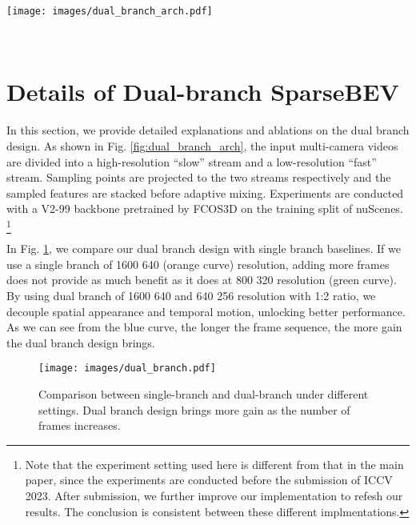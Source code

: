 \documentclass[10pt,twocolumn,letterpaper]{article}
\begin{document}
{\small


}

\begin{figure*}[t]
  \centering
  \texttt{[image: images/dual\_branch\_arch.pdf]}
  \vspace{-10pt}
  \caption{Architecture of dual-branch SparseBEV. The input multi-camera videos are divided into a high-resolution ``slow'' stream and a low-resolution ``fast'' stream.}
  \label{fig:dual_branch_arch}
\end{figure*}

\newpage
~
\newpage

\appendix

\section{Details of Dual-branch SparseBEV}

In this section, we provide detailed explanations and ablations on the dual branch design. As shown in Fig. \ref{fig:dual_branch_arch}, the input multi-camera videos are divided into a high-resolution ``slow'' stream and a low-resolution ``fast'' stream. Sampling points are projected to the two streams respectively and the sampled features are stacked before adaptive mixing. Experiments are conducted with a V2-99 backbone pretrained by FCOS3D \cite{fcos3d} on the training split of nuScenes. \footnote{Note that the experiment setting used here is different from that in the main paper, since the experiments are conducted before the submission of ICCV 2023. After submission, we further improve our implementation to refesh our results. The conclusion is consistent between these different implmentations.}

In Fig. \ref{fig:dual_branch}, we compare our dual branch design with single branch baselines. If we use a single branch of 1600  640 (orange curve) resolution, adding more frames does not provide as much benefit as it does at 800  320 resolution (green curve). By using dual branch of 1600  640 and 640  256 resolution with 1:2 ratio, we decouple spatial appearance and temporal motion, unlocking better performance. As we can see from the blue curve, the longer the frame sequence, the more gain the dual branch design brings.

\begin{figure}[t]
  \centering
  \texttt{[image: images/dual\_branch.pdf]}
  \vspace{-20pt}
  \caption{Comparison between single-branch and dual-branch under different settings. Dual branch design brings more gain as the number of frames increases.}
  \label{fig:dual_branch}
\end{figure}
\end{document}
